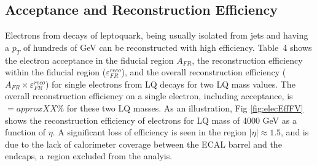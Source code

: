 

\subsection{Acceptance and Reconstruction Efficiency}

Electrons from decays of leptoquark, 
being usually isolated from jets and having a $p_{T}$ of hundreds of GeV can be reconstructed with high efficiency. 
Table~4
shows the electron acceptance in the fiducial region $A_{FR}$, the 
reconstruction efficiency within the fiducial region ($\varepsilon_{FR}^{reco}$), and the overall reconstruction efficiency 
($A_{FR} \times \varepsilon_{FR}^{reco}$) for single electrons from LQ decays for two LQ mass values.
The overall reconstruction efficiency on a single electron, including acceptance, is $= approx XX\%$ for these two LQ masses.
As an illustration, Fig \ref{fig:elecEffFV} shows the reconstruction efficiency of electrons
for LQ mass of 4000 GeV as a function of $\eta$. 
A significant loss of efficiency is seen in the region $|\eta| \approx 1.5$, and is due to the lack of calorimeter coverage between the
 ECAL barrel and the endcaps, 
a region excluded from the analyis. %

